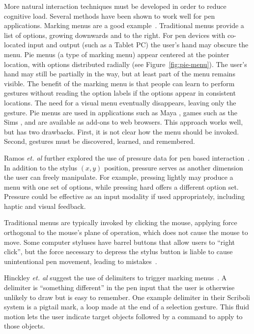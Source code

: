 More natural interaction techniques must be developed in order to
reduce cognitive load. Several methods have been shown to work well
for pen applications. Marking menus are a good
example~\cite{kurtenbach-marking-menus}. Traditional menus provide a
list of options, growing downwards and to the right. For pen devices
with co-located input and output (such as a Tablet PC) the user's hand
may obscure the menu. Pie menus (a type of marking menu) appear
centered at the pointer location, with options distributed radially
(see Figure~\ref{fig:pie-menu}). The user's hand may still be
partially in the way, but at least part of the menu remains
visible. The benefit of the marking menu is that people can learn to
perform gestures without reading the option labels if the options
appear in consistent locations. The need for a visual menu eventually
disappears, leaving only the gesture. Pie menus are used in
applications such as Maya \cite{autodesk-web}, games such as the Sims
\cite{ea-sims}, and are available as add-ons to web browsers. This
approach works well, but has two drawbacks. First, it is not clear how
the menu should be invoked. Second, gestures must be discovered,
learned, and remembered.

Ramos \textit{et. al} further explored the use of pressure data for
pen based interaction~\cite{ramos-pressure-widgets}. In addition to
the stylus $(x,y)$ position, pressure serves as another dimension the
user can freely manipulate. For example, pressing lightly may produce
a menu with one set of options, while pressing hard offers a different
option set. Pressure could be effective as an input modality if used
appropriately, including haptic and visual feedback.

Traditional menus are typically invoked by clicking the mouse,
applying force orthogonal to the mouse's plane of operation, which
does not cause the mouse to move. Some computer styluses have barrel
buttons that allow users to ``right click'', but the force necessary
to depress the stylus button is liable to cause unintentional pen
movement, leading to mistakes~\cite{hinckley-input-technology}.

Hinckley \textit{et. al} suggest the use of delimiters to trigger
marking menus~\cite{hinckley-scriboli}. A delimiter is ``something
different'' in the pen input that the user is otherwise unlikely to
draw but is easy to remember. One example delimiter in their Scriboli
system is a pigtail mark, a loop made at the end of a selection
gesture. This fluid motion lets the user indicate target objects
followed by a command to apply to those objects.

